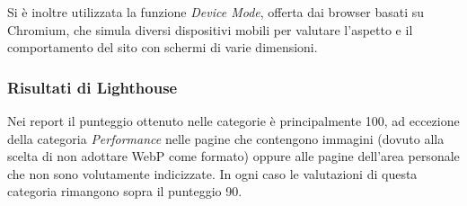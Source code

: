Si è inoltre utilizzata la funzione \textit{Device Mode}, offerta dai browser basati su Chromium, che simula diversi dispositivi mobili per valutare l'aspetto e il comportamento del sito con schermi di varie dimensioni.


\subsubsection{Risultati di Lighthouse} \label{lighthouse}
Nei report il punteggio ottenuto nelle categorie è principalmente 100, ad eccezione della categoria \textit{Performance} nelle pagine che contengono immagini (dovuto alla scelta di non adottare WebP come formato) oppure alle pagine dell'area personale che non sono volutamente indicizzate. In ogni caso le valutazioni di questa categoria rimangono sopra il punteggio 90.